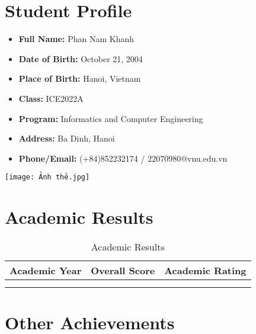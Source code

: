 \documentclass[a4paper,13pt]{report}
\begin{document}
\section{Student Profile}
\begin{itemize}
  \item \textbf{Full Name:} Phan Nam Khanh
  \item \textbf{Date of Birth:} October 21, 2004
  \item \textbf{Place of Birth:} Hanoi, Vietnam
  \item \textbf{Class:} ICE2022A
  \item \textbf{Program:} Informatics and Computer Engineering
  \item \textbf{Address:} Ba Dinh, Hanoi
  \item \textbf{Phone/Email:} (+84)852232174 / 22070980@vnu.edu.vn
\end{itemize}

\begin{minipage}[t]{0.3\textwidth}
    \vspace*{-7cm} %
    \hspace*{11cm} %
    \texttt{[image: Ảnh thẻ.jpg]} %
\end{minipage}

\section{Academic Results}
\begin{table}[h]
  \centering
  \caption{Academic Results}
  \label{tab:academic}
  \begin{tabular}{lcc}
    \toprule
    Academic Year & Overall Score & Academic Rating \\
    \midrule
     &  &  \\
     &  &  \\
    \bottomrule
  \end{tabular}
\end{table}



\section{Other Achievements}
\begin{itemize}
   
\end{itemize}
\end{document}
